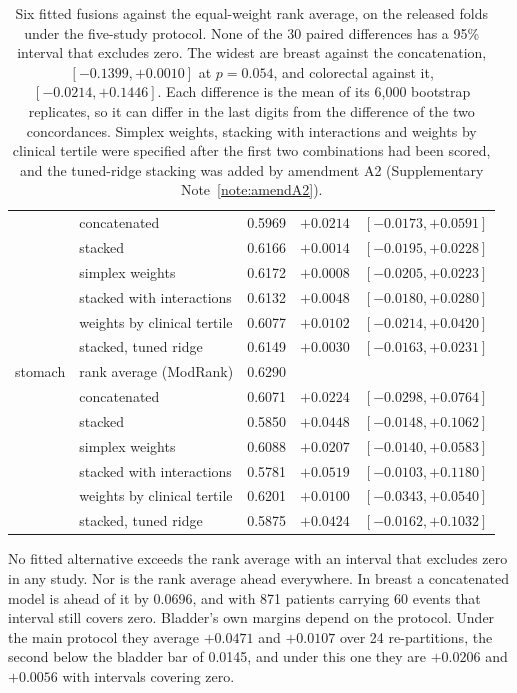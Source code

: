 \documentclass[11pt]{article}
\begin{document}
\begin{table}[h]
{\begin{tabular}{llrrr}
 & concatenated & 0.5969 & $+0.0214$ & $[-0.0173, +0.0591]$ \\
 & stacked & 0.6166 & $+0.0014$ & $[-0.0195, +0.0228]$ \\
 & simplex weights & 0.6172 & $+0.0008$ & $[-0.0205, +0.0223]$ \\
 & stacked with interactions & 0.6132 & $+0.0048$ & $[-0.0180, +0.0280]$ \\
 & weights by clinical tertile & 0.6077 & $+0.0102$ & $[-0.0214, +0.0420]$ \\
 & stacked, tuned ridge & 0.6149 & $+0.0030$ & $[-0.0163, +0.0231]$ \\
\addlinespace
stomach & rank average (ModRank) & 0.6290 & & \\
 & concatenated & 0.6071 & $+0.0224$ & $[-0.0298, +0.0764]$ \\
 & stacked & 0.5850 & $+0.0448$ & $[-0.0148, +0.1062]$ \\
 & simplex weights & 0.6088 & $+0.0207$ & $[-0.0140, +0.0583]$ \\
 & stacked with interactions & 0.5781 & $+0.0519$ & $[-0.0103, +0.1180]$ \\
 & weights by clinical tertile & 0.6201 & $+0.0100$ & $[-0.0343, +0.0540]$ \\
 & stacked, tuned ridge & 0.5875 & $+0.0424$ & $[-0.0162, +0.1032]$ \\
\bottomrule
\end{tabular}}
\caption{Six fitted fusions against the equal-weight rank average, on the released folds under the
five-study protocol. None of the 30 paired differences has a 95\% interval that excludes zero. The
widest are breast against the concatenation, $[-0.1399, +0.0010]$ at $p=0.054$, and colorectal against
it, $[-0.0214, +0.1446]$. Each difference is the mean of its 6,000 bootstrap replicates, so it can
differ in the last digits from the difference of the two concordances. Simplex weights, stacking with
interactions and weights by clinical tertile were specified after the first two combinations had been
scored, and the tuned-ridge stacking was added by amendment A2 (Supplementary
Note~\ref{note:amendA2}).}
\label{tab:fusion}
\end{table}

No fitted alternative exceeds the rank average with an interval that excludes zero in any study.
Nor is the rank average ahead everywhere. In breast a concatenated model is ahead of it by 0.0696,
and with 871 patients carrying 60 events that interval still covers zero. Bladder's own margins depend
on the protocol. Under the main protocol they average $+0.0471$ and $+0.0107$ over 24 re-partitions,
the second below the bladder bar of 0.0145, and under this one they are $+0.0206$ and $+0.0056$ with
intervals covering zero.
\end{document}
